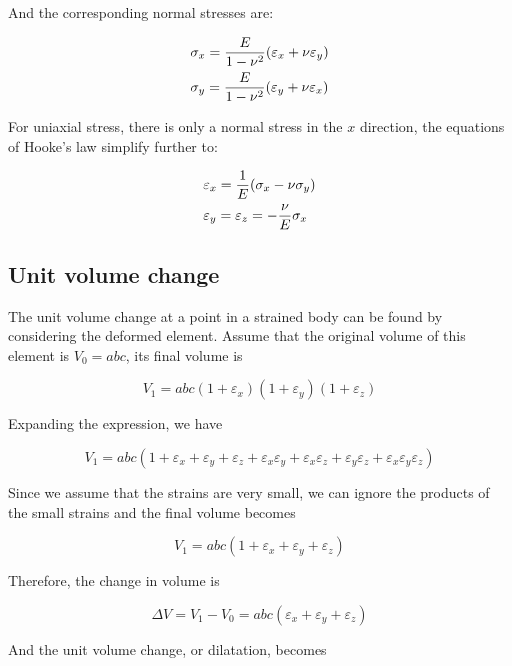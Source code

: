 \documentclass[
10pt,
a4paper,
openany,
svgnames,
]{book} %
\begin{document}
And the corresponding normal stresses are:

\begin{equation}
  \begin{gathered}
    \sigma_x = \frac{E}{1 - \nu^2}(\varepsilon_x + \nu \varepsilon_y) \hfill \\
    \sigma_y = \frac{E}{1 - \nu^2}(\varepsilon_y + \nu \varepsilon_x) \hfill
  \end{gathered}
\end{equation}

For uniaxial stress, there is only a normal stress in the $x$ direction, the equations of Hooke’s law simplify further to:

\begin{equation}
  \begin{gathered}
    \varepsilon_x = \frac{1}{E}({\sigma _x} - \nu \sigma_y) \hfill \\
    \varepsilon_y = {\varepsilon _z} =  - \frac{\nu }{E}{\sigma _x} \hfill \\ 
  \end{gathered}
\end{equation}

\subsection{Unit volume change}

The unit volume change at a point in a strained body can be found by considering the deformed element. Assume that the original volume of this element is $V_0 = abc$, its final volume is

\[V_1 = abc(1 + \varepsilon_x)(1 + \varepsilon_y)(1 + \varepsilon_z)\]

Expanding the expression, we have

\[V_1 = abc(1 + \varepsilon _x + \varepsilon _y + \varepsilon _z + \varepsilon_x\varepsilon_y + \varepsilon_x\varepsilon_z + \varepsilon_y\varepsilon_z + \varepsilon_x\varepsilon_y\varepsilon_z)\]

Since we assume that the strains are very small, we can ignore the products of the small strains and the final volume becomes

\[V_1 = abc(1 + \varepsilon_x + \varepsilon_y + \varepsilon_z)\]

Therefore, the change in volume is

\[\Delta V = V_1 - V_0 = abc(\varepsilon_x + \varepsilon_y + \varepsilon_z)\]

And the unit volume change, or dilatation, becomes
\end{document}
